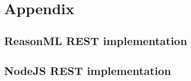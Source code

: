 \chapter*{Appendix}\label{appendix}

\section{ReasonML REST implementation}\label{reasonmlrest}
\section{NodeJS REST implementation}\label{nodejsrest}

